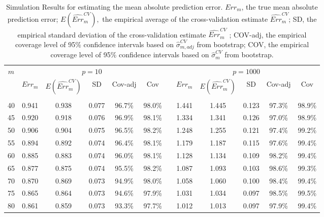 \documentclass[12pt]{article}
\begin{document}
\begin{table}[ht]{
\centering
\setlength{\tabcolsep}{3pt}
\renewcommand{\arraystretch}{0.5}
\begin{tabular}{ c ccccc c ccccc }
\hline
$m$ & \multicolumn{5}{c}{$p = 10$} & & \multicolumn{5}{c}{$p = 1000$} \\
    & $Err_m$ & $E(\widehat{Err}_m^{CV})$ & SD  & Cov-adj & Cov && $Err_m$ & $E(\hat{Err}_m^{CV})$ & SD  & Cov-adj & Cov\\
    \cline{2-6} \cline{8-12}\\
40  & 0.941 & 0.938 & 0.077 & 96.7\% & 98.0\% && 1.441 & 1.445 & 0.123 & 97.3\% & 98.9\%\\
45  & 0.920 & 0.918 & 0.076 & 96.9\% & 98.1\% && 1.334 & 1.341 & 0.126 & 97.0\% & 98.9\% \\
50  & 0.906 & 0.904 & 0.075 & 96.5\% & 98.2\% && 1.248 & 1.255 & 0.121 & 97.4\% & 99.2\% \\
55  & 0.894 & 0.892 & 0.074 & 96.4\% & 98.1\% && 1.179 & 1.187 & 0.115 & 97.6\% & 99.4\% \\
60  & 0.885 & 0.883 & 0.074 & 96.0\% & 98.1\% && 1.128 & 1.134 & 0.109 & 98.2\% & 99.4\% \\
65  & 0.877 & 0.875 & 0.074 & 95.5\% & 98.2\% && 1.087 & 1.093 & 0.103 & 98.6\% & 99.3\%\\
70  & 0.870 & 0.869 & 0.073 & 94.9\% & 98.0\% && 1.058 & 1.060 & 0.100 & 98.4\% & 99.4\% \\
75  & 0.865 & 0.864 & 0.073 & 94.6\% & 97.9\% && 1.031 & 1.034 & 0.097 & 98.5\% & 99.5\% \\
80  & 0.861 & 0.859 & 0.073 & 93.3\% & 97.7\% && 1.012 & 1.013 & 0.097 & 97.9\% & 99.4\%
\end{tabular}
\caption{Simulation Results for estimating the mean absolute prediction error.  $Err_m$, the true mean absolute prediction error; $E(\widehat{Err}_m^{CV}),$ the empirical average of the cross-validation estimate $\widehat{Err}_m^{CV}$; SD, the empirical standard deviation of the cross-validation estimate $\widehat{Err}_m^{CV}$  ; COV-adj, the empirical coverage level of 95\% confidence intervals based on $\hat{\sigma}_{m, adj}^{CV}$ from bootstrap; COV, the empirical coverage level of 95\% confidence intervals based on $\hat{\sigma}_{m}^{CV}$ from bootstrap.} \label{tab:simulm}}
\end{table} 
\end{document}

